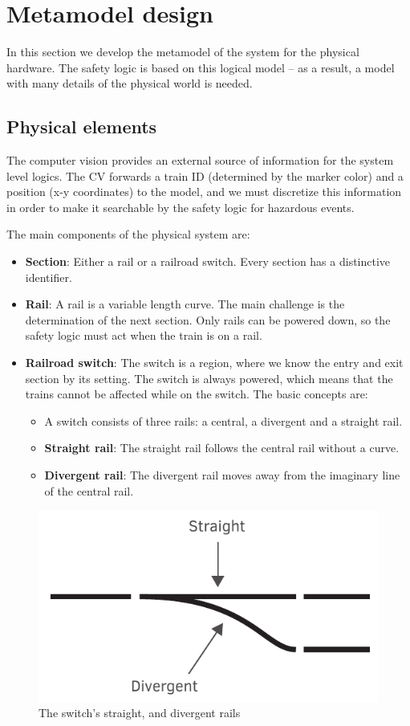 \section{Metamodel design}
In this section we develop the metamodel of the system for the physical hardware. The safety logic is based on this logical model -- as a result, a model with many details of the physical world is needed.

\subsection{Physical elements}
The computer vision provides an external source of information for the system level logics. The CV forwards a train ID (determined by the marker color) and a position (x-y coordinates) to the model, and we must discretize this information in order to make it searchable by the safety logic for hazardous events.

The main components of the physical system are:
\begin{itemize}
	\item \textbf{Section}: Either a rail or a railroad switch. Every section has a distinctive identifier.
	\item \textbf{Rail}: A rail is a variable length curve. The main challenge is the determination of the next section. Only rails can be powered down, so the safety logic must act when the train is on a rail.
	\item \textbf{Railroad switch}: The switch is a region, where we know the entry and exit section by its setting. The switch is always powered, which means that the trains cannot be affected while on the switch. The basic concepts are:
	\begin{itemize}
		\item A switch consists of three rails: a central, a divergent and a straight rail.
		\item \textbf{Straight rail}: The straight rail follows the central rail without a curve.
		\item \textbf{Divergent rail}: The divergent rail moves away from the imaginary line of the central rail.
	\end{itemize}
\end{itemize}

\begin{figure}[h]
	\centering
	\includegraphics[width=0.5\linewidth]{include/figures/chapter_6/metamodel_switch_basics}
	\caption{The switch's straight, and divergent rails}
	\label{fig:case_study:metamodel_switch_basics}
\end{figure}


